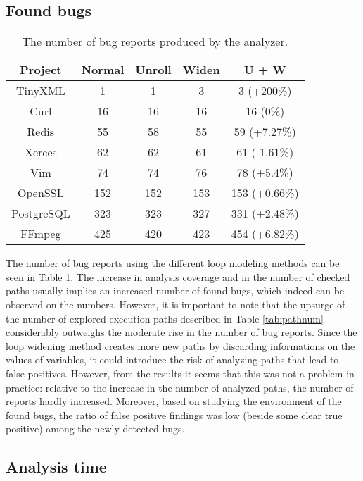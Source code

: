 \subsection{Found bugs}
\begin{table}[!htb]
	\centering
\begin{tabular}{ |c||c|c|c|c| } 
	\hline
	Project & Normal & Unroll & Widen & U + W \\
	\hline \hline
	TinyXML & 1 & 1 & 3 & 3 (+200\%) \\
	\hline
	Curl & 16 & 16 & 16 & 16 (0\%) \\ 
	\hline
	Redis & 55 & 58 & 55 & 59 (+7.27\%) \\ 
	\hline
	Xerces & 62 & 62 & 61 & 61 (-1.61\%) \\ 
	\hline
	Vim & 74 & 74 & 76 & 78 (+5.4\%) \\
	\hline
	OpenSSL & 152 & 152 & 153 & 153 (+0.66\%) \\ 
	\hline
	PostgreSQL & 323 & 323 & 327 & 331 (+2.48\%) \\ 
	\hline
	FFmpeg & 425 & 420 & 423 & 454 (+6.82\%) \\ 		
	\hline
\end{tabular}
\caption{The number of bug reports produced by the analyzer.} \label{tab:reportnum}
\end{table}
The number of bug reports using the different loop modeling methods can be seen
in Table \ref{tab:reportnum}. The increase in analysis coverage and in the number of 
checked paths usually implies an increased number of found bugs, which indeed can be 
observed on the numbers. However, it is important to note that the upsurge of the number 
of explored execution paths described in Table \ref{tab:pathnum} considerably outweighs 
the moderate rise in the number of bug reports.
Since the loop widening method creates more new paths by discarding informations on the values of variables, it could introduce the risk of analyzing paths that lead to false positives.
However, from the results it seems that this was not a problem in practice: relative to the increase in the number of analyzed paths, the number of reports hardly increased. Moreover, based on studying the environment of the found bugs, the ratio of false positive findings was low (beside some clear true positive) among the newly detected bugs.

\subsection{Analysis time}


